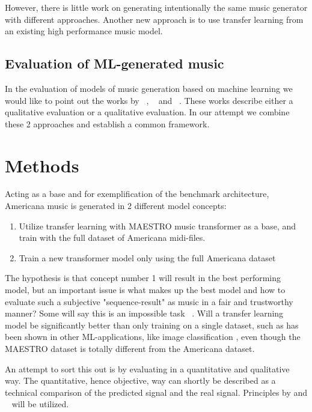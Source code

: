 \documentclass{IEEEtran}
\begin{document}
        However, there is little work on generating intentionally the same music generator
        with different approaches. Another new approach is to use transfer learning from
        an existing high performance music model.

        \subsection{Evaluation of ML-generated music}
        In the evaluation of models of music generation based on machine learning we
        would like to point out the works by \citeauthor{1030094}~\cite{1030094},
        \citeauthor{yang2020evaluation}~\cite{yang2020evaluation}
        and \citeauthor{wu2020jazz}~\cite{wu2020jazz}.
        These works describe either a qualitative evaluation or a qualitative evaluation.
        In our attempt we combine these 2 approaches and establish a common framework.

    \section{Methods}

        Acting as a base and for exemplification of the benchmark architecture,
        Americana music is generated in 2 different model concepts:
        \begin{enumerate}
            \item Utilize transfer learning with MAESTRO music transformer as a base,
                    and train with the full dataset of Americana midi-files.
            \item Train a new transformer model only using the full Americana dataset
        \end{enumerate} 
        
        The hypothesis is that concept number 1 will result in the best performing model,
        but an important issue is what makes up the best model and how to evaluate such a
        subjective "sequence-result" as music in a fair and trustworthy manner? 
        Some will say this is an impossible task ~\cite{1030094}. Will a transfer learning model be significantly better than only training on a single dataset, such as has been shown in other ML-applications, like image classification \cite{7404017}, even though the MAESTRO dataset is totally different from the Americana dataset.

        An attempt to sort this out is by evaluating in a quantitative and qualitative way.
        The quantitative, hence objective, way can shortly be described as a technical
        comparison of the predicted signal and the real signal. Principles by \cite{yang2020evaluation} and ~\cite{wu2020jazz} will be utilized.
        
\end{document}
